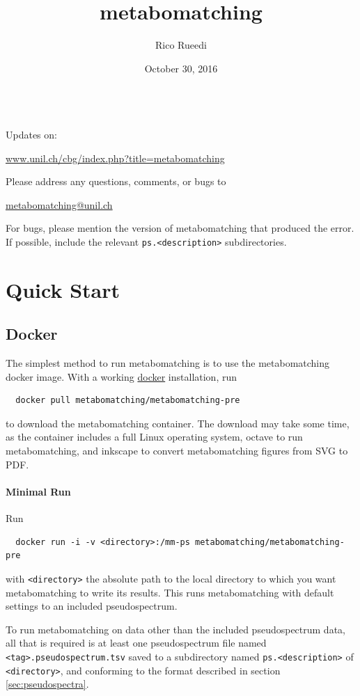 \documentclass[a4paper,11pt]{article}
\title{metabomatching}
\author{Rico Rueedi}
\date{October 30, 2016}
\begin{document}
\maketitle\quad\\[16mm]
Updates on:
\begin{center}\href{http://www.unil.ch/cbg/index.php?title=metabomatching}{www.unil.ch/cbg/index.php?title=metabomatching}\end{center}
Please address any questions, comments, or bugs to
\begin{center}
\href{mailto:metabomatching@unil.ch}{metabomatching@unil.ch}
\end{center}
For bugs, please mention the version of metabomatching that produced the error. If possible, include the relevant \verb|ps.<description>| subdirectories.
\tableofcontents
\section{Quick Start}
\subsection{Docker}
The simplest method to run metabomatching is to use the metabomatching docker image. With a working \href{http://www.docker.com/products/overview}{docker} installation, run
\begin{verbatim}
  docker pull metabomatching/metabomatching-pre
\end{verbatim}
to download the metabomatching container. The download may take some time, as the container includes a full Linux operating system, octave to run metabomatching, and inkscape to convert metabomatching figures from SVG to PDF. 
\paragraph{Minimal Run} Run
\begin{verbatim}
  docker run -i -v <directory>:/mm-ps metabomatching/metabomatching-pre
\end{verbatim}
with \verb|<directory>| the absolute path to the local directory to which you want metabomatching to write its results. This runs metabomatching with default settings to an included pseudospectrum.

To run metabomatching on data other than the included pseudospectrum data, all that is required is at least one pseudospectrum file named \texttt{<tag>.pseudospectrum.tsv} saved to a subdirectory named \texttt{ps.<description>} of \verb|<directory>|, and conforming to the format described in section \ref{sec:pseudospectra}.
\end{document}
